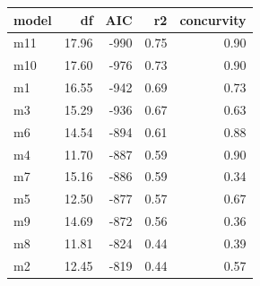 \begin{table}[ht]
\centering
\begin{tabular}{lrrrr}
  \hline
model & df & AIC & r2 & concurvity \\ 
  \hline
m11 & 17.96 & -990 & 0.75 & 0.90 \\ 
  m10 & 17.60 & -976 & 0.73 & 0.90 \\ 
  m1 & 16.55 & -942 & 0.69 & 0.73 \\ 
  m3 & 15.29 & -936 & 0.67 & 0.63 \\ 
  m6 & 14.54 & -894 & 0.61 & 0.88 \\ 
  m4 & 11.70 & -887 & 0.59 & 0.90 \\ 
  m7 & 15.16 & -886 & 0.59 & 0.34 \\ 
  m5 & 12.50 & -877 & 0.57 & 0.67 \\ 
  m9 & 14.69 & -872 & 0.56 & 0.36 \\ 
  m8 & 11.81 & -824 & 0.44 & 0.39 \\ 
  m2 & 12.45 & -819 & 0.44 & 0.57 \\ 
   \hline
\end{tabular}
\end{table}
